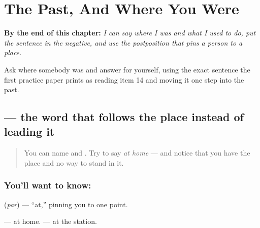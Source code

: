 
\chapter{The Past, And Where You Were}
\label{ch:hi-atit}

\begin{chapteropening}
\textbf{By the end of this chapter:} \emph{I can say where I was and what I used to do, put the sentence in the negative, and use the postposition that pins a person to a place.}

Ask where somebody was and answer for yourself, using the exact sentence the first practice paper prints as reading item 14 and moving it one step into the past.
\end{chapteropening}

\section[\texorpdfstring{\hi{पर} (par)}{पर (par)}]{ — the word that follows the place instead of leading it}

\label{lesson:HI-C87-par}



\begin{quote}
You can name \textbf{} and \textbf{}. Try to say \emph{at home} — and notice that you have the place and no way to stand in it.
\end{quote}

\subsection*{You'll want to know: }
\textbf{} (\emph{par}) — \textquotedblleft{}at,\textquotedblright{} pinning you to one point.

\textbf{ } — at home. \textbf{ } — at the station.

